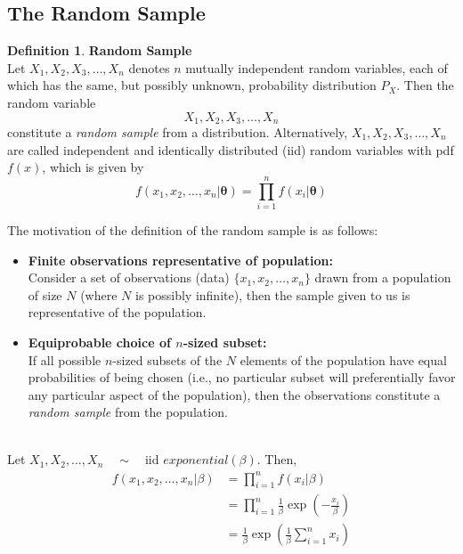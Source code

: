 \documentclass[twoside]{article}
\makeatletter
\theoremstyle{definition}
\newtheorem{definition}{Definition}[section]
\theoremstyle{remark}
\theoremstyle{remark}
\newenvironment{example}
 {\patchcmd{\@thm}{\trivlist}{\list{}{\leftmargin=3em \rightmargin=3em}}{}{}%
  \vspace*{10\p@}
  \innerexample\pushQED{\hfill\ensuremath{\Diamond}}}
 {\popQED\endinnerexample}
\makeatother
\begin{document}
\subsection{The Random Sample}
\begin{definition}{\bf Random Sample} \\
  Let $X_1, X_2, X_3, \ldots, X_n$ denotes $n$ mutually independent random
  variables, each of which has the same, but possibly unknown, probability
  distribution $P_X$. Then the random variable
  \begin{equation}
    X_1, X_2, X_3, \ldots, X_n
  \end{equation}
  constitute a \textit{random sample} from a distribution.
  Alternatively, $X_1, X_2, X_3, \ldots, X_n$ are called independent and
  identically distributed (iid) random variables with pdf $f(x)$, which
  is given by
  \begin{equation}
    f(x_1, x_2, \ldots, x_n | \boldsymbol{\theta})
    = \prod_{i=1}^{n} f(x_i | \boldsymbol{\theta})
  \end{equation}
\end{definition}

The motivation of the definition of the random sample is as follows:
\begin{itemize}
  \item \textbf{Finite observations representative of population:} \\
  Consider a set of observations (data) $\{x_1 ,x_2, \ldots, x_n\}$ drawn
  from a population of size $N$ (where $N$ is possibly infinite), then the
  sample given to us is representative of the population.
  \item \textbf{Equiprobable choice of $n$-sized subset:} \\
  If all possible $n$-sized subsets of the $N$ elements of the population have
  equal probabilities of being chosen (i.e., no particular subset will
  preferentially favor any particular aspect of the population), then the
  observations constitute a \textit{random sample} from the population.
\end{itemize}

\begin{example}{\it exponential random sample} \\
  Let $X_1, X_2, \ldots, X_n \quad \sim \quad \textrm{iid } exponential(\beta)$.
  Then,
  \begin{equation*}
    \begin{split}
      f(x_1, x_2, \ldots, x_n | \beta)
      &= \prod_{i=1}^{n} f(x_i | \beta) \\
      &= \prod_{i=1}^{n} \frac{1}{\beta} \exp\left({-\frac{x_i}{\beta}}\right) \\
      &= \frac{1}{\beta} \exp{\left( \frac{1}{\beta} \sum_{i=1}^{n} x_i \right)}
    \end{split}
  \end{equation*}
\end{example}
\end{document}
